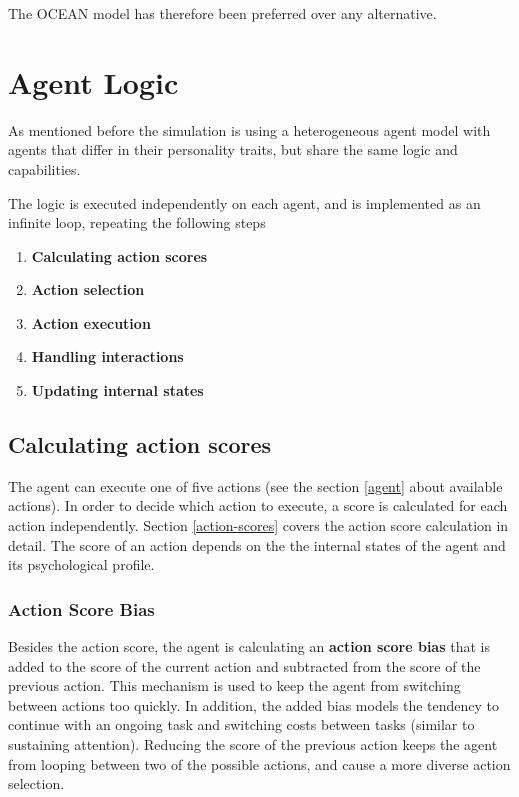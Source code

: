 \bb

The OCEAN model has therefore been preferred over any alternative.

\pagebreak

\section{Agent Logic}
As mentioned before the simulation is using a heterogeneous agent model with agents
that differ in their personality traits, but share the same logic and capabilities.

The logic is executed independently on each agent, and is implemented as an infinite
loop, repeating the following steps

\begin{enumerate}
    \item \textbf{Calculating action scores}
    \item \textbf{Action selection}
    \item \textbf{Action execution}
    \item \textbf{Handling interactions}
    \item \textbf{Updating internal states}
\end{enumerate}

\subsection{Calculating action scores}
The agent can execute one of five actions (see the section \ref{agent} about available actions).
In order to decide which action to execute, a score is calculated for each action independently.
Section \ref{action-scores} covers the action score calculation in detail. 
The score of an action depends on the the internal states of the agent and its
psychological profile.

\subsubsection{Action Score Bias}
Besides the action score, the agent is calculating an \textbf{action score bias}
that is added to the score of the current action and subtracted from the score
of the previous action. This mechanism is used to keep the agent from switching
between actions too quickly. In addition, the added bias models the tendency to
continue with an ongoing task and switching costs between tasks (similar to sustaining attention).
Reducing the score of the previous action keeps the agent from looping between two
of the possible actions, and cause a more diverse action selection.

